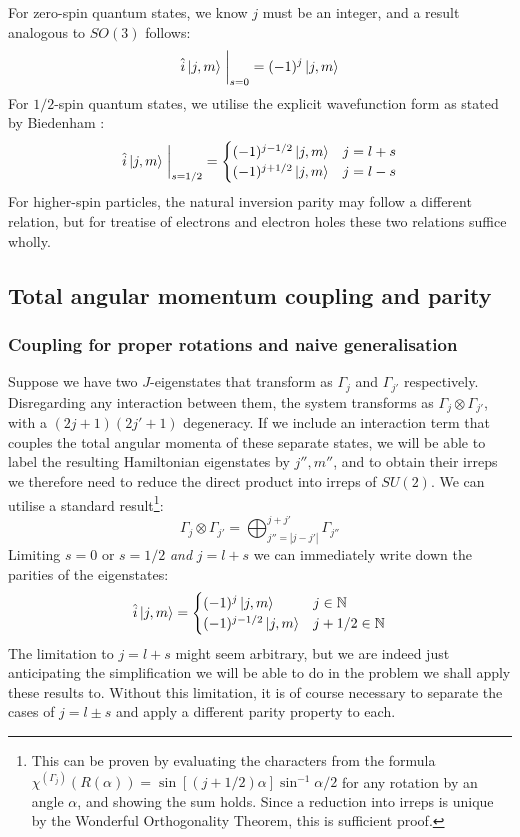 \documentclass[12pt]{article}
\begin{document}
	For zero-spin quantum states, we know $j$ must be an integer, and a result analogous to $SO(3)$ follows:
	$$\hat{i}\ket{j,m}\eval_{s=0}=(-1)^j\ket{j,m}$$
	For $1/2$-spin quantum states, we utilise the explicit wavefunction form as stated by Biedenham \cite[p. 283]{spinor_spherical_harmonics}:
	$$\hat{i}\ket{j,m}\eval_{s=1/2}=
	\begin{cases}
	(-1)^{j-1/2}\ket{j,m} & j = l + s\\
	(-1)^{j+1/2}\ket{j,m} & j = l - s
	\end{cases}$$
	For higher-spin particles, the natural inversion parity may follow a different relation, but for treatise of electrons and electron holes these two relations suffice wholly.
	
	\subsection{Total angular momentum coupling and parity}
	
	\subsubsection{Coupling for proper rotations and naive generalisation}
	Suppose we have two $J$-eigenstates that transform as $\Gamma_{j}$ and $\Gamma_{j'}$ respectively. Disregarding any interaction between them, the system transforms as $\Gamma_{j}\otimes\Gamma_{j'}$, with a $(2j+1)(2j'+1)$ degeneracy. If we include an interaction term that couples the total angular momenta of these separate states, we will be able to label the resulting Hamiltonian eigenstates by $j'',m''$, and to obtain their irreps we therefore need to reduce the direct product into irreps of $SU(2)$. We can utilise a standard result\footnote{This can be proven by evaluating the characters from the formula $\chi^{\left(\Gamma_j\right)}(R(\alpha))=\sin{\left[(j+1/2)\alpha\right]}\sin^{-1}\alpha/2$ for any rotation by an angle $\alpha$, and showing the sum holds. Since a reduction into irreps is unique by the Wonderful Orthogonality Theorem, this is sufficient proof.}:
	$$\Gamma_j\otimes\Gamma_{j'}=\bigoplus_{j''=|j-j'|}^{j+j'}\Gamma_{j''}$$
	Limiting $s=0$ or $s=1/2$ \textit{and} $j=l+s$ we can immediately write down the parities of the eigenstates:
	$$\hat{i}\ket{j,m}=\begin{cases}
	(-1)^j\ket{j,m} & j\in\mathbb{N}\\
	(-1)^{j-1/2}\ket{j,m} & j+1/2\in\mathbb{N}
	\end{cases}$$
	The limitation to $j=l+s$ might seem arbitrary, but we are indeed just anticipating the simplification we will be able to do in the problem we shall apply these results to. Without this limitation, it is of course necessary to separate the cases of $j=l\pm s$ and apply a different parity property to each.
	
\end{document}
